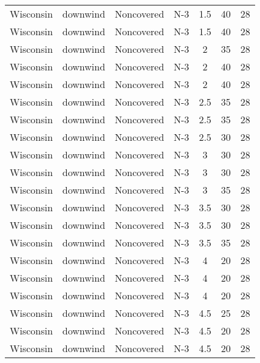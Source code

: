 \documentclass{article}
\begin{document}
\begin{longtable}[c]{ccccccc}
Wisconsin & downwind  & Noncovered & N-3             & 1.5          & 40          & 28  \\
Wisconsin & downwind  & Noncovered & N-3             & 1.5          & 40          & 28  \\
Wisconsin & downwind  & Noncovered & N-3             & 2            & 35          & 28  \\
Wisconsin & downwind  & Noncovered & N-3             & 2            & 40          & 28  \\
Wisconsin & downwind  & Noncovered & N-3             & 2            & 40          & 28  \\
Wisconsin & downwind  & Noncovered & N-3             & 2.5          & 35          & 28  \\
Wisconsin & downwind  & Noncovered & N-3             & 2.5          & 35          & 28  \\
Wisconsin & downwind  & Noncovered & N-3             & 2.5          & 30          & 28  \\
Wisconsin & downwind  & Noncovered & N-3             & 3            & 30          & 28  \\
Wisconsin & downwind  & Noncovered & N-3             & 3            & 30          & 28  \\
Wisconsin & downwind  & Noncovered & N-3             & 3            & 35          & 28  \\
Wisconsin & downwind  & Noncovered & N-3             & 3.5          & 30          & 28  \\
Wisconsin & downwind  & Noncovered & N-3             & 3.5          & 30          & 28  \\
Wisconsin & downwind  & Noncovered & N-3             & 3.5          & 35          & 28  \\
Wisconsin & downwind  & Noncovered & N-3             & 4            & 20          & 28  \\
Wisconsin & downwind  & Noncovered & N-3             & 4            & 20          & 28  \\
Wisconsin & downwind  & Noncovered & N-3             & 4            & 20          & 28  \\
Wisconsin & downwind  & Noncovered & N-3             & 4.5          & 25          & 28  \\
Wisconsin & downwind  & Noncovered & N-3             & 4.5          & 20          & 28  \\
Wisconsin & downwind  & Noncovered & N-3             & 4.5          & 20          & 28  \\

\end{longtable}
\end{document}
